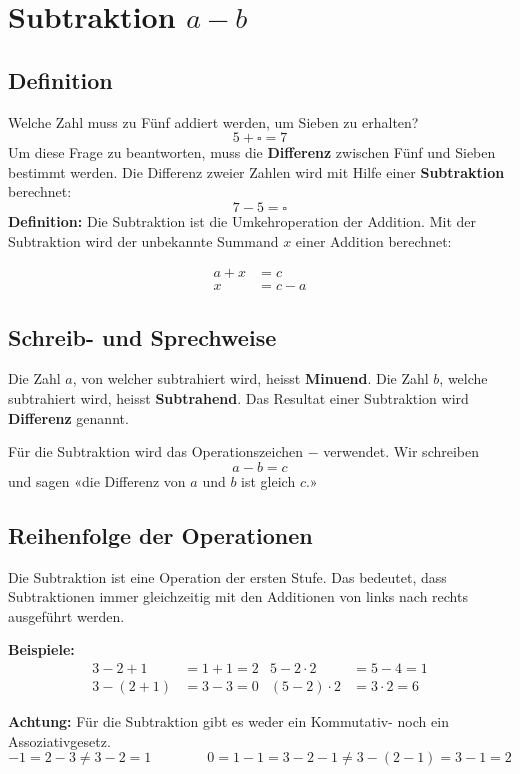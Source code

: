 \newpage
\section{Subtraktion $a-b$}

\subsection{Definition}

Welche Zahl muss zu Fünf addiert werden, um Sieben zu erhalten?
\[
  5 + \square = 7
\]
Um diese Frage zu beantworten, muss die \textbf{Differenz} zwischen Fünf und Sieben bestimmt werden. Die Differenz zweier Zahlen wird mit Hilfe einer \textbf{Subtraktion} berechnet:
\[
  7 - 5 = \square
\]
\textbf{Definition:} Die Subtraktion ist die Umkehroperation der Addition. Mit der Subtraktion wird der unbekannte Summand $x$ einer Addition berechnet:

\begin{align*}
  a+x &= c \\
    x &= c-a
\end{align*}

\subsection{Schreib- und Sprechweise}

Die Zahl $a$, von welcher subtrahiert wird, heisst \textbf{Minuend}. Die Zahl $b$, welche subtrahiert wird, heisst \textbf{Subtrahend}. Das Resultat einer Subtraktion wird \textbf{Differenz} genannt.

Für die Subtraktion wird das Operationszeichen $-$ verwendet. Wir schreiben
\[
  a - b = c
\]
und sagen «die Differenz von $a$ und $b$ ist gleich $c$.»

\subsection{Reihenfolge der Operationen}

Die Subtraktion ist eine Operation der ersten Stufe. Das bedeutet, dass Subtraktionen immer gleichzeitig mit den Additionen von links nach rechts ausgeführt werden.
\begin{example}
  \textbf{Beispiele:}
  \begin{align*}
      3-2+1 &= 1+1 = 2 &   5-2\cdot 2 &= 5-4 = 1 \\
    3-(2+1) &= 3-3 = 0 & (5-2)\cdot 2 &= 3\cdot 2 = 6
  \end{align*}
\end{example}
\begin{note}
  \textbf{Achtung:} Für die Subtraktion gibt es weder ein Kommutativ- noch ein Assoziativgesetz.
  \[
    -1 = 2-3 \ne 3-2 = 1 \qquad\qquad 0 = 1-1 = 3-2-1 \ne 3-(2-1) = 3-1 = 2
  \]
\end{note}
